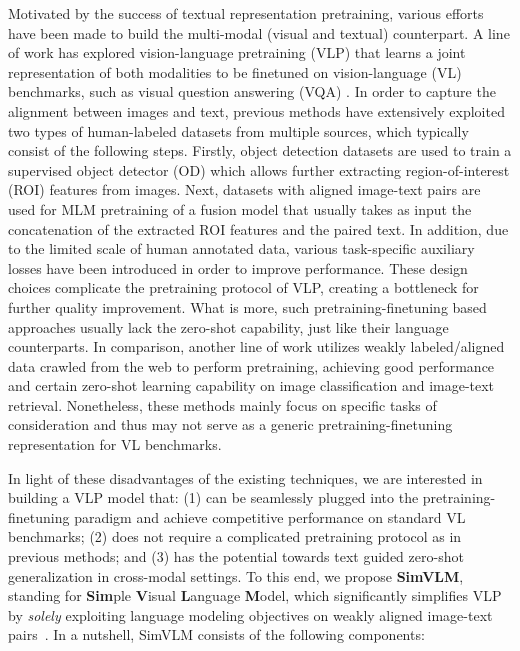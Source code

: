 Motivated by the success of textual representation pretraining, various efforts have been made to build the multi-modal (visual and textual) counterpart. A line of work \citep{tan-bansal-2019-lxmert,jiasen2019vilbert,li2019visualbert,chen2020uniter,li2020oscar,Su2020VL-BERT,Zhang_2021_CVPR} has explored vision-language pretraining (VLP) that learns a joint representation of both modalities to be finetuned on vision-language (VL) benchmarks, such as visual question answering (VQA) \citep{goyal2017making}. In order to capture the alignment between images and text, previous methods have extensively exploited two types of human-labeled datasets from multiple sources, which typically consist of the following steps. Firstly, object detection datasets are used to train a supervised object detector (OD) which allows further extracting region-of-interest (ROI) features from images. Next, datasets with aligned image-text pairs are used for MLM pretraining of a fusion model that usually takes as input the concatenation of the extracted ROI features and the paired text. In addition, due to the limited scale of human annotated data, various task-specific auxiliary losses have been introduced in order to improve performance. These design choices complicate the pretraining protocol of VLP, creating a bottleneck for further quality improvement. What is more, such pretraining-finetuning based approaches usually lack the zero-shot capability, just like their language counterparts. In comparison, another line of work \citep{radford2021learning,ramesh2021zero,jia2021scaling} utilizes weakly labeled/aligned data crawled from the web to perform pretraining, achieving good performance and certain zero-shot learning capability on image classification and image-text retrieval. Nonetheless, these methods mainly focus on specific tasks of consideration and thus may not serve as a generic pretraining-finetuning representation for VL benchmarks.

In light of these disadvantages of the existing techniques, we are interested in building a VLP model that: (1) can be seamlessly plugged into the pretraining-finetuning paradigm and achieve competitive performance on standard VL benchmarks; (2) does not require a complicated pretraining protocol as in previous methods; and (3) has the potential towards text guided zero-shot generalization in cross-modal settings. To this end, we propose \textbf{SimVLM}, standing for \textbf{Sim}ple \textbf{V}isual \textbf{L}anguage \textbf{M}odel, which significantly simplifies VLP by \textit{solely} exploiting language modeling objectives on weakly aligned image-text pairs~\citep{jia2021scaling}. In a nutshell, {SimVLM} consists of the following components:

